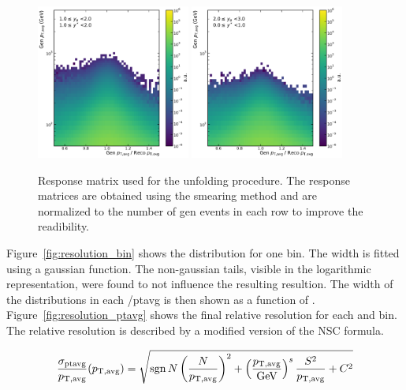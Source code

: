 \begin{figure}[htbp]
    \includegraphics[width=0.45\textwidth]{figures/measurement/gen_vs_reco_vs_gen_ptavg_yb1ys1.pdf}\hfill
    \includegraphics[width=0.45\textwidth]{figures/measurement/gen_vs_reco_vs_gen_ptavg_yb2ys0.pdf}
    \caption{Response matrix used for the unfolding procedure. The response matrices are obtained
            using the smearing method and are normalized to the number of gen events in each row to improve
            the readibility.}
    \label{fig:gen_vs_reco_over_gen}
\end{figure}

Figure~\ref{fig:resolution_bin} shows the distribution for one \ptavg bin. The
width is fitted using a gaussian function. The non-gaussian tails, visible in
the logarithmic representation, were found to not influence the resulting
resultion. The width of the distributions in each /ptavg is then shown as a
function of \ptavg. Figure~\ref{fig:resolution_ptavg} shows the final relative
resolution for each \ystar and \yboost bin. The relative resolution is described
by a modified version of the NSC formula.

\begin{equation}
    \frac{\sigma_{\text{ptavg}}}{p_{\mathrm{T,avg}}} (p_{\mathrm{T,avg}}) = \sqrt{\operatorname{sgn}{N} \left(\frac{N}{p_{\mathrm{T,avg}}}\right)^2 + \left(\frac{p_{\mathrm{T,avg}}}{\text{GeV}}\right)^s \frac{S^2}{p_{\mathrm{T,avg}}} + C^2 }
    \label{eq:resolution}
\end{equation}

